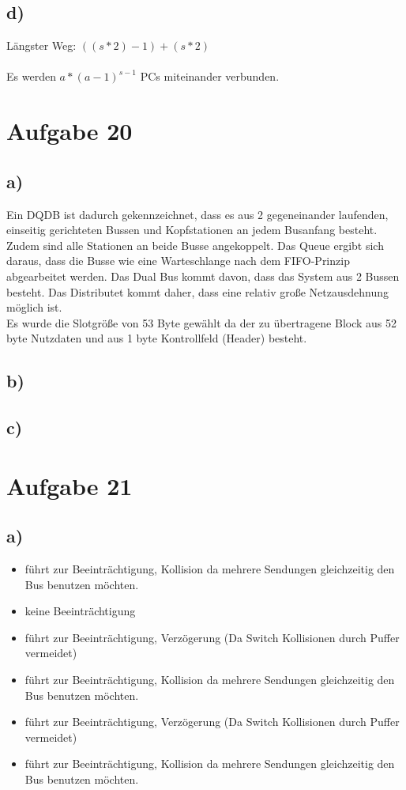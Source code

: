 \documentclass[a4paper,12pt]{scrartcl}
\begin{document}
\subsection{d)}
Längster Weg: $((s*2)-1) + (s*2)$
\\
\\
Es werden $a*(a-1)^{s-1}$ PCs miteinander verbunden.

\section{Aufgabe 20}

\subsection{a)}
Ein DQDB ist dadurch gekennzeichnet, dass es aus 2 gegeneinander laufenden, einseitig gerichteten Bussen und Kopfstationen an jedem Busanfang besteht. Zudem sind alle Stationen an beide Busse angekoppelt. Das Queue ergibt sich daraus, dass die Busse wie eine Warteschlange nach dem FIFO-Prinzip abgearbeitet werden. Das Dual Bus kommt davon, dass das System aus 2 Bussen besteht. Das Distributet kommt daher, dass eine relativ große Netzausdehnung möglich ist.
\\
Es wurde die Slotgröße von 53 Byte gewählt da der zu übertragene Block aus 52 byte  Nutzdaten und aus 1 byte Kontrollfeld (Header) besteht.

\subsection{b)}

\subsection{c)}

\section{Aufgabe 21}

\subsection{a)}
\begin{itemize}
	\item führt zur Beeinträchtigung, Kollision da mehrere Sendungen gleichzeitig den Bus benutzen möchten.
	\item keine Beeinträchtigung
    \item führt zur Beeinträchtigung, Verzögerung (Da Switch Kollisionen durch Puffer vermeidet)
    \item führt zur Beeinträchtigung, Kollision da mehrere Sendungen gleichzeitig den Bus benutzen möchten.
    \item führt zur Beeinträchtigung, Verzögerung (Da Switch Kollisionen durch Puffer vermeidet)
    \item führt zur Beeinträchtigung, Kollision da mehrere Sendungen gleichzeitig den Bus benutzen möchten.
\end{itemize}
\end{document}
